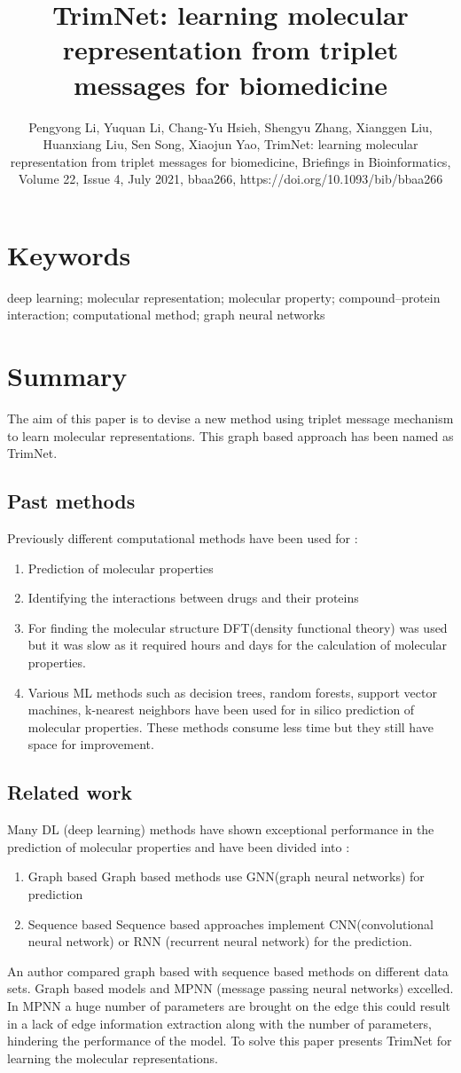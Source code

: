 \documentclass[12pt]{osa-supplemental-document}
\title{TrimNet: learning molecular representation
from triplet messages for biomedicine}
\author{Pengyong Li, Yuquan Li, Chang-Yu Hsieh, Shengyu Zhang, Xianggen Liu, Huanxiang Liu, Sen Song, Xiaojun Yao, TrimNet: learning molecular representation from triplet messages for biomedicine, Briefings in Bioinformatics, Volume 22, Issue 4, July 2021, bbaa266, https://doi.org/10.1093/bib/bbaa266}
\begin{document}
\maketitle

\section*{Keywords}

deep learning; molecular representation; molecular property; compound–protein interaction; computational
method; graph neural networks


\section*{Summary}
The aim of this paper is to devise a new method using triplet message mechanism to learn molecular representations. This graph based approach has been named as TrimNet.

\subsection*{Past methods}
Previously different computational methods have been used for :
\begin{enumerate}
    \item Prediction of molecular properties
    \item Identifying the interactions between drugs and their proteins
    \item For finding the molecular structure DFT(density functional theory) was used but it was slow as it required hours and days for the calculation of molecular properties.
    \item Various ML methods such as decision trees, random forests, support vector machines, k-nearest neighbors have been used for in silico prediction of molecular properties. These methods consume less time but they still have space for improvement.
\end{enumerate}

\subsection*{Related work}
Many DL (deep learning) methods have shown exceptional performance in the prediction of molecular properties and have been divided into :
\begin{enumerate}
    \item Graph based
    Graph based methods use GNN(graph neural networks) for prediction
    \item Sequence based 
   Sequence based approaches implement CNN(convolutional neural network) or RNN (recurrent neural network) for the prediction.
\end{enumerate}
An author compared graph based with sequence based methods on different data sets. Graph based models and MPNN (message passing neural networks) excelled. In MPNN a huge number of parameters are brought on the edge this could result in a lack of edge information extraction along with the number of parameters, hindering the performance of the model. To solve this paper presents TrimNet for learning the molecular representations. 
\end{document}
